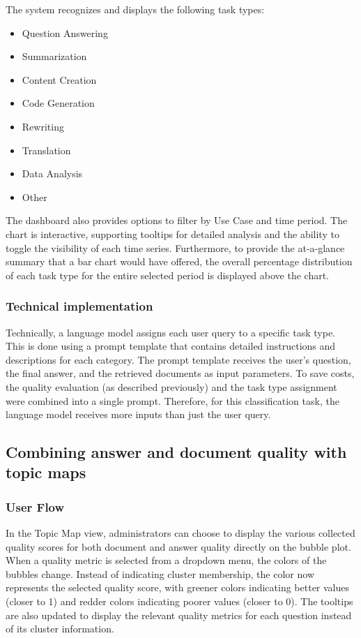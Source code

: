 \documentclass[
	english,
	ruledheaders=section,%
	class=report,%
	thesis={type=bachelor},%
	accentcolor=1b,%
	custommargins=true,%
	marginpar=false,%
	parskip=half-,%
	fontsize=11pt,%
	DIV=14,
]{tudapub}
\begin{document}
The system recognizes and displays the following task types:
\begin{itemize}
    \item Question Answering
    \item Summarization
    \item Content Creation
    \item Code Generation
    \item Rewriting
    \item Translation
    \item Data Analysis
    \item Other
\end{itemize}

The dashboard also provides options to filter by Use Case and time period. The chart is interactive, supporting tooltips for detailed analysis and the ability to toggle the visibility of each time series. Furthermore, to provide the at-a-glance summary that a bar chart would have offered, the overall percentage distribution of each task type for the entire selected period is displayed above the chart.

\subsubsection{Technical implementation}
Technically, a language model assigns each user query to a specific task type. This is done using a prompt template that contains detailed instructions and descriptions for each category. The prompt template receives the user's question, the final answer, and the retrieved documents as input parameters. To save costs, the quality evaluation (as described previously) and the task type assignment were combined into a single prompt. Therefore, for this classification task, the language model receives more inputs than just the user query.
\subsection{Combining answer and document quality with topic maps}
\subsubsection{User Flow}
In the Topic Map view, administrators can choose to display the various collected quality scores for both document and answer quality directly on the bubble plot. When a quality metric is selected from a dropdown menu, the colors of the bubbles change. Instead of indicating cluster membership, the color now represents the selected quality score, with greener colors indicating better values (closer to 1) and redder colors indicating poorer values (closer to 0). The tooltips are also updated to display the relevant quality metrics for each question instead of its cluster information.
\end{document}
